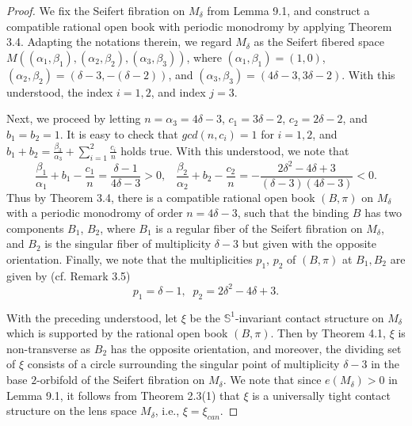 \documentclass[11pt]{amsart}
\theoremstyle{plain}
\numberwithin{theorem}{section}
\theoremstyle{definition}
\newcommand{\s}{{\mathbb S}}
\begin{document}
\begin{proof}
We fix the Seifert fibration on $M_\delta$ from Lemma 9.1, and construct a compatible rational open book with periodic monodromy by applying Theorem 3.4. Adapting the notations therein, we regard $M_\delta$ as the Seifert fibered space $M((\alpha_1,\beta_1), (\alpha_2,\beta_2), 
(\alpha_3,\beta_3))$, where $(\alpha_1,\beta_1)=(1,0)$, $(\alpha_2,\beta_2)=(\delta-3, -(\delta-2))$, and $(\alpha_3,\beta_3)=(4\delta-3, 3\delta-2)$. With this understood, the index $i=1,2$, and index $j=3$.

Next, we proceed by letting $n=\alpha_3=4\delta-3$, $c_1=3\delta-2$, $c_2=2\delta-2$, and $b_1=b_2=1$. It is easy to check that $gcd(n,c_i)=1$ for $i=1,2$, and
$b_1+b_2=\frac{\beta_3}{\alpha_3}+\sum_{i=1}^2 \frac{c_i}{n}$ holds true. With this understood, we note that
$$
\frac{\beta_1}{\alpha_1}+b_1-\frac{c_1}{n}=\frac{\delta-1}{4\delta-3}>0,\;\;\; 
\frac{\beta_2}{\alpha_2}+b_2-\frac{c_2}{n}=-\frac{2\delta^2-4\delta+3}{(\delta-3)(4\delta-3)}<0.
$$
Thus by Theorem 3.4, there is a compatible rational open book $(B,\pi)$ on $M_\delta$ with
a periodic monodromy of order $n=4\delta-3$, such that the binding $B$ has two components 
$B_1$, $B_2$, where $B_1$ is a regular fiber of the Seifert fibration on $M_\delta$, and $B_2$ is the singular fiber of multiplicity $\delta-3$ but given with the opposite orientation. Finally, we note that the multiplicities 
$p_1$, $p_2$ of $(B,\pi)$ at $B_1,B_2$ are given by (cf. Remark 3.5)
$$
p_1=\delta-1,\;\; p_2=2\delta^2-4\delta+3.
$$

With the preceding understood, let $\xi$ be the $\s^1$-invariant contact structure on $M_\delta$
which is supported by the rational open book $(B,\pi)$. Then by Theorem 4.1, $\xi$ is non-transverse 
as $B_2$ has the opposite orientation, and moreover, the dividing set of $\xi$ consists of a circle surrounding the singular point of multiplicity $\delta-3$ in the base $2$-orbifold of the Seifert fibration on $M_\delta$. We note that since $e(M_\delta)>0$ in Lemma 9.1, it follows from Theorem 2.3(1) that
$\xi$ is a universally tight contact structure on the lens space $M_\delta$, i.e., $\xi=\xi_{can}$.


\end{proof}
\end{document}
